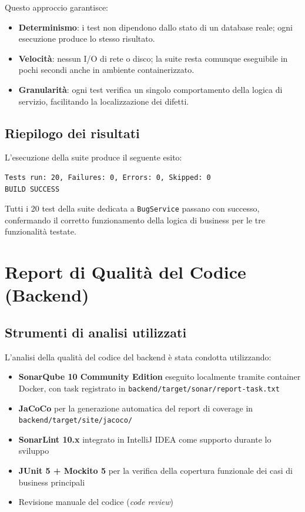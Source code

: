 ﻿\documentclass[a4paper,11pt]{article}
\begin{document}
\vspace{0.3cm}

Questo approccio garantisce:
\begin{itemize}
  \item \textbf{Determinismo}: i test non dipendono dallo stato di un database reale; ogni esecuzione produce lo stesso risultato.
  \item \textbf{Velocit\`a}: nessun I/O di rete o disco; la suite resta comunque eseguibile in pochi secondi anche in ambiente containerizzato.
  \item \textbf{Granularit\`a}: ogni test verifica un singolo comportamento della logica di servizio, facilitando la localizzazione dei difetti.
\end{itemize}

\subsection{Riepilogo dei risultati}

L'esecuzione della suite produce il seguente esito:

\begin{verbatim}
Tests run: 20, Failures: 0, Errors: 0, Skipped: 0
BUILD SUCCESS
\end{verbatim}

Tutti i 20 test della suite dedicata a \texttt{BugService} passano con successo, confermando il corretto funzionamento della logica di business per le tre funzionalit\`a testate.

\section{Report di Qualit\`a del Codice (Backend)}

\subsection{Strumenti di analisi utilizzati}

L'analisi della qualit\`a del codice del backend \`e stata condotta utilizzando:
\begin{itemize}
  \item \textbf{SonarQube 10 Community Edition} eseguito localmente tramite container Docker, con task registrato in \texttt{backend/target/sonar/report-task.txt}
  \item \textbf{JaCoCo} per la generazione automatica del report di coverage in \texttt{backend/target/site/jacoco/}
  \item \textbf{SonarLint 10.x} integrato in IntelliJ IDEA come supporto durante lo sviluppo
  \item \textbf{JUnit 5 + Mockito 5} per la verifica della copertura funzionale dei casi di business principali
  \item Revisione manuale del codice (\emph{code review})
\end{itemize}
\end{document}
